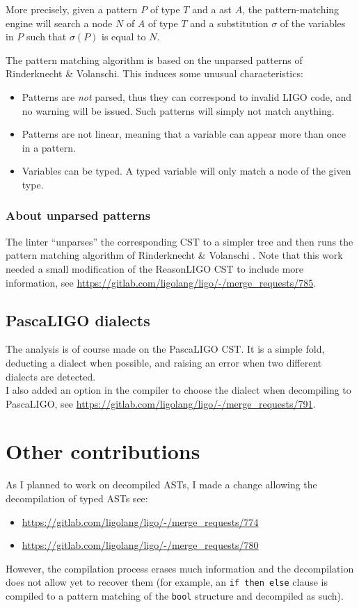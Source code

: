 \documentclass[10pt,a4paper]{article}
\begin{document}
More precisely, given a pattern $P$ of type $T$ and a ast $A$, the pattern-matching engine will search a node $N$ of $A$ of type $T$ and a substitution $\sigma$ of the variables in $P$ such that $\sigma(P)$ is equal to $N$.

The pattern matching algorithm is based on the unparsed patterns of Rinderknecht \& Volanschi\cite{unparsedpatterns}. This induces some unusual characteristics:

\begin{itemize}
\item Patterns are \emph{not} parsed, thus they can correspond to invalid LIGO code, and no warning will be issued. Such patterns will simply not match anything.
\item Patterns are not linear, meaning that a variable can appear more than once in a pattern.
\item Variables can be typed. A typed variable will only match a node of the given type.
\end{itemize}

\subsubsection{About unparsed patterns}
The linter ``unparses'' the corresponding CST to a simpler tree and then runs the pattern matching algorithm of Rinderknecht \& Volanschi \cite{unparsedpatterns}.
Note that this work needed a small modification of the ReasonLIGO CST to include more information, see \url{https://gitlab.com/ligolang/ligo/-/merge_requests/785}.

\subsection{PascaLIGO dialects}
The analysis is of course made on the PascaLIGO CST. It is a simple fold, deducting a dialect when possible, and raising an error when two different dialects are detected.\\
I also added an option in the compiler to choose the dialect when decompiling to PascaLIGO, see \url{https://gitlab.com/ligolang/ligo/-/merge_requests/791}.

\section{Other contributions}
As I planned to work on decompiled ASTs, I made a change allowing the decompilation of typed ASTs see:
\begin{itemize}
\item \url{https://gitlab.com/ligolang/ligo/-/merge_requests/774}
\item \url{https://gitlab.com/ligolang/ligo/-/merge_requests/780}
\end{itemize}
However, the compilation process erases much information and the decompilation does not allow yet to recover them (for example, an \verb|if then else| clause is compiled to a pattern matching of the \verb|bool| structure and decompiled as such).
\end{document}
